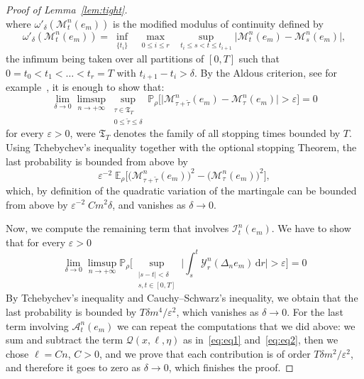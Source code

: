 \documentclass[AHL,Unicode,longabstracts]{cedram}
\newcommand{\mc}[1]{{\mathcal #1}}
\renewcommand{\mc}[1]{{\mathcal #1}}
\renewcommand{\leq}{\leqslant}
\renewcommand{\tilde}{\widetilde}
\renewcommand{\epsilon}{\varepsilon}
\newcommand*{\dd}{\mathrm{d}}
\newcommand*{\dr}{\dd r}
\begin{document}
\begin{proof}[Proof of Lemma~\ref{lem:tight}]
\begin{equation*}
\end{equation*}
where $\omega'_{\delta}(\mathcal{M}^{n}_t(e_m))$ is the modified modulus of continuity defined by
\begin{equation*}
\omega'_{\delta}(\mathcal{M}^{n}_t(e_m))=\inf_{\substack{\{t_{i}\}}}\;\max_{\substack{0\leq{i}\leq{r}}}\;\sup_{t_{i}
\leq{s}<{t}\leq{t_{i+1}}}\big|\mathcal{M}_{t}^{n}(e_m)-\mathcal{M}_{s}^{n}(e_m)\big|,
\end{equation*}
the infimum being taken over all partitions of $[0,T]$ such that $0=t_{0}<t_{1}<\dots<t_{r}=T$ with $t_{i+1}-t_{i}>\delta$. By the Aldous criterion, see for example~\cite[Proposition~4.1.6]{kl}, it is enough to show that:
\begin{equation*}
\lim_{\delta\rightarrow{0}}\limsup_{n\rightarrow{+\infty}}\sup_{\substack{\tau\in{\mathfrak {T}_{T}}\\0\leq{\tilde\tau}\leq{\delta}}}\mathbb{P}_{\rho}\Big[\big|\mathcal{M}_{\tau+\tilde\tau}^{n}(e_m)-\mathcal{M}_{\tau}^{n}(e_m)\big|>\epsilon\Big]=0
\end{equation*}
for every $\epsilon>0$, were $\mathfrak {T}_{T}$ denotes the family of all stopping times bounded by $T$. Using Tchebychev's inequality together with the optional stopping Theorem, the last probability is bounded from above by
\begin{equation*}
\epsilon^{-2}\;\mathbb{E}_{\rho}\Big[\big(\mathcal{M}_{\tau+\tilde\tau}^{n}(e_m)\big)^{2}-\big(\mathcal{M}_{\tau}^{n}(e_m)\big)^{2}\Big],
\end{equation*}
which, by definition of the quadratic variation of the martingale can be bounded from above by $\epsilon^{-2}\;Cm^2\delta$, and vanishes as $\delta\to 0$.

Now, we compute the remaining term that involves $\mathcal I_t^n(e_m)$. We have to show that for every $\epsilon>0$
\begin{equation*}
\lim_{\delta\rightarrow{0}}\limsup_{n\rightarrow{+\infty}}
\mathbb{P}_{\rho}\Bigg[\sup_{\substack{|s-t|<\delta\\s,t\in[0,T]}}\bigg|
\int_{s}^{t}\mathcal Y_r^n(\Delta_n e_m)\,\dr\bigg|>\epsilon\Bigg]=0
\end{equation*}
By Tchebychev's inequality and Cauchy--Schwarz's inequality, we obtain that the last probability is bounded by $T\delta m^4/\epsilon ^2$, which vanishes as $\delta\to0$. For the last term involving $\mathcal A_t^n(e_m)$ we can repeat the computations that we did above: we sum and subtract the term $\mc Q(x,\ell,\eta)$ as in~\eqref{eq:eq1} and~\eqref{eq:eq2}, then we chose $\ell = C n$, $C>0$, and we prove that each contribution is of order $T\delta m^2/\varepsilon^2$, and therefore it goes to zero as $\delta\to0$, which finishes the proof.
\end{proof}
\end{document}
